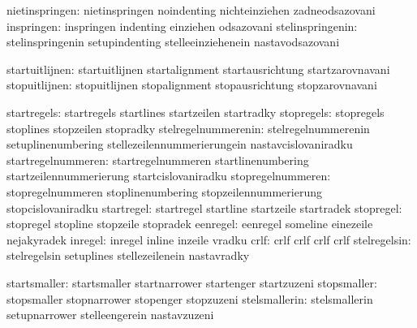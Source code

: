                nietinspringen:  nietinspringen               noindenting
                                nichteinziehen               zadneodsazovani
                   inspringen:  inspringen                   indenting
                                einziehen                    odsazovani
             stelinspringenin:  stelinspringenin             setupindenting
                                stelleeinziehenein           nastavodsazovani

               startuitlijnen:  startuitlijnen               startalignment
                                startausrichtung             startzarovnavani
                stopuitlijnen:  stopuitlijnen                stopalignment
                                stopausrichtung              stopzarovnavani

                  startregels:  startregels                  startlines
                                startzeilen                  startradky
                   stopregels:  stopregels                   stoplines
                                stopzeilen                   stopradky
          stelregelnummerenin:  stelregelnummerenin          setuplinenumbering
                                stellezeilennummerierungein  nastavcislovaniradku
           startregelnummeren:  startregelnummeren           startlinenumbering
                                startzeilennummerierung      startcislovaniradku
            stopregelnummeren:  stopregelnummeren            stoplinenumbering
                                stopzeilennummerierung       stopcislovaniradku
                   startregel:  startregel                   startline
                                startzeile                   startradek
                    stopregel:  stopregel                    stopline
                                stopzeile                    stopradek
                     eenregel:  eenregel                     someline
                                einezeile                    nejakyradek
                      inregel:  inregel                      inline
                                inzeile                      vradku
                         crlf:  crlf                         crlf
                                crlf                         crlf
                 stelregelsin:  stelregelsin                 setuplines
                                stellezeilenein              nastavradky

                 startsmaller:  startsmaller                 startnarrower
                                startenger                   startzuzeni
                  stopsmaller:  stopsmaller                  stopnarrower
                                stopenger                    stopzuzeni
                stelsmallerin:  stelsmallerin                setupnarrower
                                stelleengerein               nastavzuzeni

